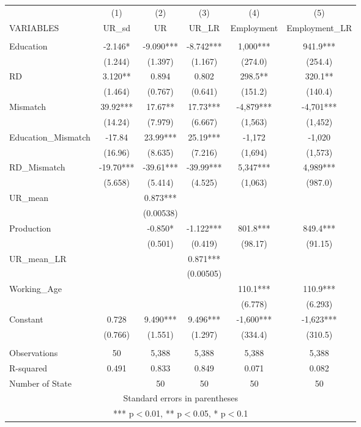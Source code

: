 \documentclass[]{article}
\begin{document}
\begin{tabular}{lccccc} \hline
 & (1) & (2) & (3) & (4) & (5) \\
VARIABLES & UR\_sd & UR & UR\_LR & Employment & Employment\_LR \\ \hline
 &  &  &  &  &  \\
Education & -2.146* & -9.090*** & -8.742*** & 1,000*** & 941.9*** \\
 & (1.244) & (1.397) & (1.167) & (274.0) & (254.4) \\
RD & 3.120** & 0.894 & 0.802 & 298.5** & 320.1** \\
 & (1.464) & (0.767) & (0.641) & (151.2) & (140.4) \\
Mismatch & 39.92*** & 17.67** & 17.73*** & -4,879*** & -4,701*** \\
 & (14.24) & (7.979) & (6.667) & (1,563) & (1,452) \\
Education\_Mismatch & -17.84 & 23.99*** & 25.19*** & -1,172 & -1,020 \\
 & (16.96) & (8.635) & (7.216) & (1,694) & (1,573) \\
RD\_Mismatch & -19.70*** & -39.61*** & -39.99*** & 5,347*** & 4,989*** \\
 & (5.658) & (5.414) & (4.525) & (1,063) & (987.0) \\
UR\_mean &  & 0.873*** &  &  &  \\
 &  & (0.00538) &  &  &  \\
Production &  & -0.850* & -1.122*** & 801.8*** & 849.4*** \\
 &  & (0.501) & (0.419) & (98.17) & (91.15) \\
UR\_mean\_LR &  &  & 0.871*** &  &  \\
 &  &  & (0.00505) &  &  \\
Working\_Age &  &  &  & 110.1*** & 110.9*** \\
 &  &  &  & (6.778) & (6.293) \\
Constant & 0.728 & 9.490*** & 9.496*** & -1,600*** & -1,623*** \\
 & (0.766) & (1.551) & (1.297) & (334.4) & (310.5) \\
 &  &  &  &  &  \\
Observations & 50 & 5,388 & 5,388 & 5,388 & 5,388 \\
R-squared & 0.491 & 0.833 & 0.849 & 0.071 & 0.082 \\
 Number of State &  & 50 & 50 & 50 & 50 \\ \hline
\multicolumn{6}{c}{ Standard errors in parentheses} \\
\multicolumn{6}{c}{ *** p$<$0.01, ** p$<$0.05, * p$<$0.1} \\
\end{tabular}
\end{document}
